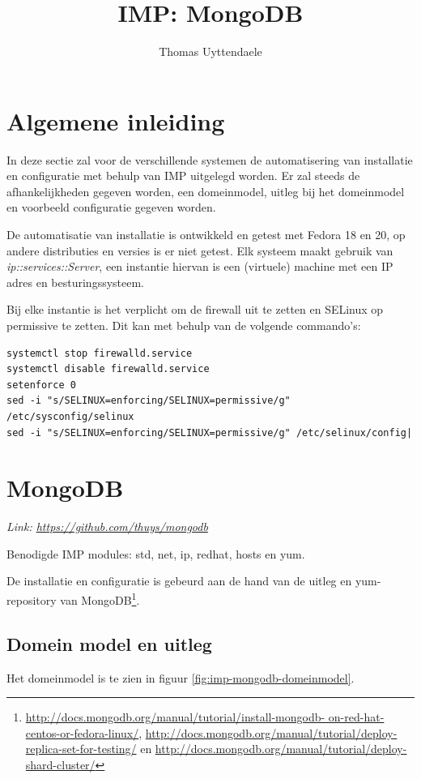 \documentclass[]{article}
\title{IMP: MongoDB}
\author{Thomas Uyttendaele}
\begin{document}
\maketitle
\section{Algemene inleiding}
In deze sectie zal voor de verschillende systemen de automatisering van installatie en configuratie met behulp van IMP uitgelegd worden. Er zal steeds de afhankelijkheden gegeven worden, een domeinmodel, uitleg bij het domeinmodel en voorbeeld configuratie gegeven worden. 

De automatisatie van installatie is ontwikkeld en getest met Fedora 18 en 20, op andere distributies en versies is er niet getest. 
Elk systeem maakt gebruik van \textit{ip::services::Server}, een instantie hiervan is een (virtuele) machine met een IP adres en besturingssysteem. 

Bij elke instantie is het verplicht om de firewall uit te zetten en SELinux op permissive te zetten. Dit kan met behulp van de volgende commando's: 
\begin{lstlisting}[frame=single, breaklines=true]
systemctl stop firewalld.service  
systemctl disable firewalld.service  
setenforce 0
sed -i "s/SELINUX=enforcing/SELINUX=permissive/g" /etc/sysconfig/selinux
sed -i "s/SELINUX=enforcing/SELINUX=permissive/g" /etc/selinux/config|
\end{lstlisting}

\section{MongoDB}
\textit{Link: \url{https://github.com/thuys/mongodb}}

Benodigde IMP modules: std, net, ip, redhat, hosts en yum. 

De installatie en configuratie is gebeurd aan de hand van de uitleg en yum-repository van MongoDB\footnote{\url {http://docs.mongodb.org/manual/tutorial/install-mongodb- on-red-hat-centos-or-fedora-linux/}, \url{http://docs.mongodb.org/manual/tutorial/deploy-replica-set-for-testing/} en  \url{http://docs.mongodb.org/manual/tutorial/deploy-shard-cluster/}}. 

\subsection{Domein model en uitleg}
Het domeinmodel is te zien in figuur \ref{fig:imp-mongodb-domeinmodel}.
\end{document}
